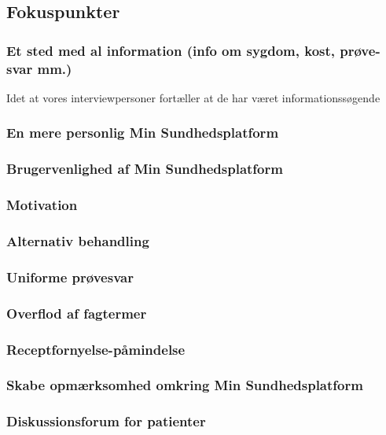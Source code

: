 \subsection{Fokuspunkter}
\subsubsection{Et sted med al information (info om sygdom, kost, prøve-svar mm.)}
Idet at vores interviewpersoner fortæller at de har været informationssøgende 
\subsubsection{En mere personlig Min Sundhedsplatform}
\subsubsection{Brugervenlighed af Min Sundhedsplatform}
\subsubsection{Motivation}
\subsubsection{Alternativ behandling}
\subsubsection{Uniforme prøvesvar}
\subsubsection{Overflod af fagtermer}
\subsubsection{Receptfornyelse-påmindelse}
\subsubsection{Skabe opmærksomhed omkring Min Sundhedsplatform}
\subsubsection{Diskussionsforum for patienter}


